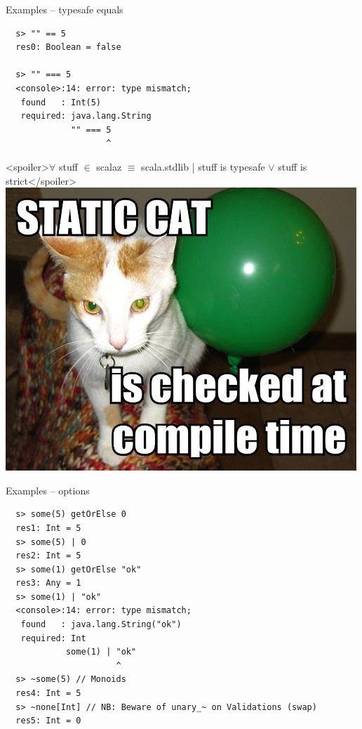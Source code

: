 \documentclass{beamer}
\begin{document}
\begin{frame}[fragile]{Examples -- typesafe equals}
  \begin{verbatim}
  s> "" == 5
  res0: Boolean = false

  s> "" === 5
  <console>:14: error: type mismatch;
   found   : Int(5)
   required: java.lang.String
             "" === 5
                    ^
  \end{verbatim}
  <spoiler>$\forall$ stuff $\in$ scalaz $\equiv$ scala.stdlib | stuff is typesafe $\vee$ stuff is strict</spoiler>\newline
  \includegraphics[scale=0.15]{img/static_cat}
\end{frame}

\begin{frame}[fragile]{Examples -- options}
  \begin{verbatim}
  s> some(5) getOrElse 0
  res1: Int = 5
  s> some(5) | 0
  res2: Int = 5
  s> some(1) getOrElse "ok"
  res3: Any = 1
  s> some(1) | "ok"
  <console>:14: error: type mismatch;
   found   : java.lang.String("ok")
   required: Int
            some(1) | "ok"
                      ^
  s> ~some(5) // Monoids
  res4: Int = 5
  s> ~none[Int] // NB: Beware of unary_~ on Validations (swap)
  res5: Int = 0
  \end{verbatim}
\end{frame}
\end{document}
